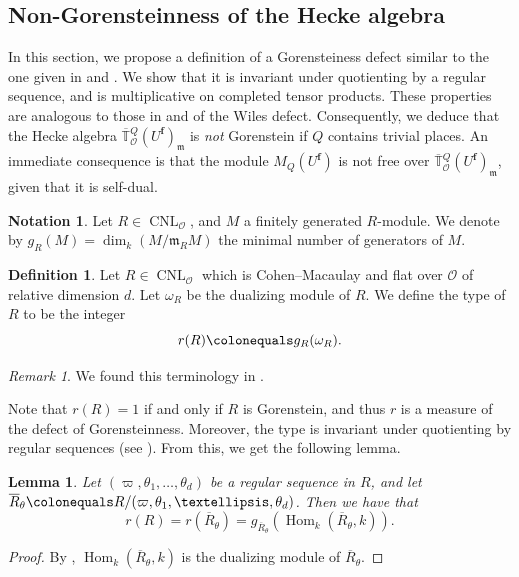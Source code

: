 \documentclass[a4paper, notitlepage, 10pt]{amsart}
\theoremstyle{plain} %
\newtheorem{lemma}[theorem]{Lemma}
\theoremstyle{definition} %
\newtheorem{definition}[theorem]{Definition}
\newtheorem{notation}[theorem]{Notation}
\theoremstyle{remark} %
\newtheorem{remark}[theorem]{Remark}
\numberwithin{equation}{section}
\newcommand{\bbT}{\mathbb T}
\newcommand{\CNL}{\operatorname{CNL}}
\newcommand{\Hom}{\operatorname{Hom}} %
\begin{document}
 \subsection{Non-Gorensteinness of the Hecke algebra}\label{nonGorenstein}
In this section, we propose a definition of a Gorensteiness defect similar to the one given in \cite{WWE21} and \cite{KW08}. We show that it is invariant under quotienting by a regular sequence, and is multiplicative on completed tensor products. These properties are analogous to those in  and  of the Wiles defect. Consequently, we deduce that the Hecke algebra $\overline{\bbT}{}^{Q}_{\mathcal{O}}(U^{\mathbf{f}})_{\mathfrak{m}}$ is \emph{not} Gorenstein if $Q$ contains trivial places. An immediate consequence is that the module $M_Q(U^{\mathbf{f}})$ is not free over $\overline{\bbT}{}^{Q}_{\mathcal{O}}(U^{\mathbf{f}})_{\mathfrak{m}}$, given that it is self-dual.
\begin{notation}
    Let $R\in \CNL_{\mathcal{O}}$, and $M$ a finitely generated $R$-module. We denote by $g_R(M)=\dim_k(M/\mathfrak{m}_RM)$ the minimal number of generators of $M$.
\end{notation}
\begin{definition}
     Let $R\in \CNL_{\mathcal{O}}$ which is Cohen--Macaulay and flat over $\mathcal{O}$ of relative dimension $d$. Let $\omega_R$ be the dualizing module of $R$. We define the type of $R$ to be the integer
     $$ r(R) \colonequals g_R(\omega_R).$$
\end{definition}
\begin{remark}
     We found this terminology in \cite[3.6.13]{BH98}.
\end{remark}
Note that $r(R)=1$ if and only if $R$ is Gorenstein, and thus $r$ is a measure of the defect of Gorensteinness. Moreover, the type is invariant under quotienting by regular sequences (see \cite[\S 21.3]{Eisen}). From this, we get the following lemma.
\begin{lemma}\label{Gdefectdim0}
   Let $(\varpi,\theta_1,\dots,\theta_d)$ be a regular sequence in $R$, and let $\overline{R}_\theta\colonequals R/(\varpi,\theta_1,\dots,\theta_d)$. Then we have that 
    $$ r(R)=r(\overline{R}_{\theta})= g_{\overline{R}_{\theta}}(\Hom_{k}(\overline{R}_\theta,k)).$$
\end{lemma}
\begin{proof}
    By \cite[Theorem 21.15]{Eisen}, $\Hom_{k}(\overline{R}_\theta,k)$ is the dualizing module of $\overline{R}_\theta$.
\end{proof}
\end{document}
